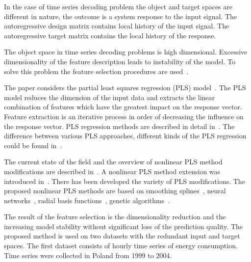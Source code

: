\documentclass[12pt,twoside]{article}
\begin{document}
In the case of time series decoding problem the object and target spaces are different in nature, the outcome is a system response to the input signal.
The autoregressive design matrix contains local history of the input signal.
The autoregressive target matrix contains the local history of the response.

The object space in time series decoding problems is high dimensional.
Excessive dimensionality of the feature description leads to instability of the model.
To solve this problem the feature selection procedures are used~\cite{katrutsa2015qpfs,li2016feature}.

The paper considers the partial least squares regression (PLS) model~\cite{wegelin2000survey,abdi2003pls,geladi1986partial}.
The PLS model reduces the dimension of the input data and extracts the linear combination of features which have the greatest impact on the response vector.
Feature extraction is an iterative process in order of decreasing the influence on the response vector.
PLS regression methods are described in detail in~\cite{geladi1988pls, hoskuldsson1988plsr,de1993simpls}.
The difference between various PLS approaches, different kinds of the PLS regression could be found in~\cite{rosipal2006overview}.

The current state of the field and the overview of nonlinear PLS method modifications are described in~\cite{rosipal2011npls}.
A nonlinear PLS method extension was introduced in~\cite{wold1989nonlinear}.
There has been developed the variety of PLS modifications.
The proposed nonlinear PLS methods are based on smoothing splines~\cite{frank1990npls}, neural networks~\cite{qin1992npls}, radial basis functions~\cite{yan2003geneticpls}, genetic algorithms~\cite{hiden1998geneticpls}.

The result of the feature selection is the dimensionality reduction and the increasing model stability without significant loss of the prediction quality.
The proposed method is used on two datasets with the redundant input and target spaces.
The first dataset consists of hourly time series of energy consumption. 
Time series were collected in Poland from 1999 to 2004.
\end{document}
